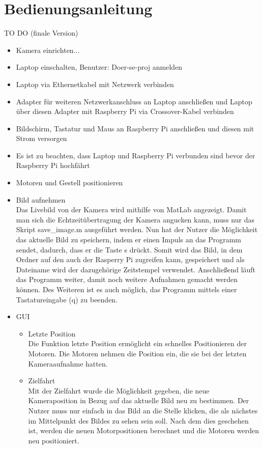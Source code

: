 \documentclass[12pt,a4paper,bibliography=totocnumbered,listof=totocnumbered]{scrartcl}
\begin{document}
\section{Bedienungsanleitung}
TO DO (finale Version)
\renewcommand{\labelitemi}{$\bullet$}
\renewcommand{\labelitemii}{$\bullet$}
\begin{itemize} 
\item Kamera einrichten...
\item Laptop einschalten, Benutzer: Doer-se-proj anmelden
\item Laptop via Ethernetkabel mit Netzwerk verbinden
\item Adapter für weiteren Netzwerkanschluss an Laptop anschließen und Laptop über diesen Adapter mit Raspberry Pi via Crossover-Kabel verbinden
\item Bildschirm, Tastatur und Maus an Raspberry Pi anschließen und diesen mit Strom versorgen
\item Es ist zu beachten, dass Laptop und Raspberry Pi verbunden sind bevor der Raspberry Pi hochfährt
\item Motoren und Gestell positionieren\\
\item Bild aufnehmen\\
Das Livebild von der Kamera wird mithilfe von MatLab angezeigt. Damit man sich die Echtzeitübertragung der Kamera angucken kann, muss nur das Skript \glqq save\_image.m\grqq{} ausgeführt werden. Nun hat der Nutzer die Möglichkeit das aktuelle Bild zu speichern, indem er einen Impuls an das Programm sendet, dadurch, dass er  die Taste \glqq s\grqq{} drückt. Somit wird das Bild, in dem Ordner auf den auch der Rasperry Pi zugreifen kann, gespeichert und als Dateiname wird der dazugehörige Zeitstempel verwendet. Anschließend läuft das Programm weiter, damit noch weitere Aufnahmen gemacht werden können. Des Weiteren ist es auch möglich, das Programm mittels einer Tastatureingabe (\glqq q\grqq{}) zu beenden.
\item GUI 
\begin{itemize}
\item Letzte Position\\
Die Funktion \glqq letzte Position\grqq{} ermöglicht ein schnelles Positionieren der Motoren. Die Motoren nehmen die Position ein, die sie bei der letzten Kameraaufnahme hatten.
\item Zielfahrt\\
Mit der \glqq Zielfahrt\grqq{} wurde die Möglichkeit gegeben, die neue Kameraposition in Bezug auf  das aktuelle Bild neu zu bestimmen. Der Nutzer muss nur einfach in das Bild an die Stelle klicken, die als nächstes im Mittelpunkt des Bildes zu sehen sein soll. Nach dem dies geschehen ist, werden die neuen Motorpositionen berechnet und die Motoren werden neu positioniert.

\end{itemize}
\end{itemize}
\end{document}
